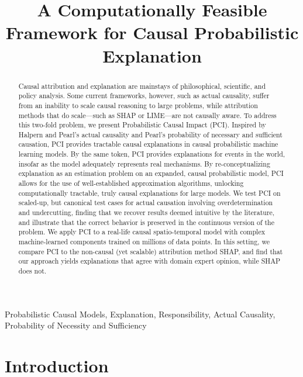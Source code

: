 \documentclass[anon,12pt]{clear2026} %
\title[Explainable]{A Computationally Feasible Framework for  Causal Probabilistic Explanation}
\newcommand{\ourapproach}{PCI }
\newcommand{\Ourapproach}{PCI}
\begin{document}
\maketitle

\begin{abstract}%
  Causal attribution and explanation are mainstays of philosophical, scientific, and policy analysis. Some current frameworks, however, such as actual causality, suffer from an inability to scale causal reasoning to large problems, while attribution methods that do scale---such as SHAP or LIME---are not causally aware. To address this two-fold problem, we present Probabilistic Causal Impact (\Ourapproach). Inspired by Halpern and Pearl's actual causality and Pearl's probability of necessary and sufficient causation, \ourapproach provides tractable causal explanations in causal probabilistic machine learning models. By the same token, \ourapproach provides explanations for events in the world, insofar as the model adequately represents real mechanisms. By re-conceptualizing explanation as an estimation problem on an expanded, causal probabilistic model, \ourapproach allows for the use of well-established approximation algorithms, unlocking computationally tractable, truly causal explanations for large models. We test \ourapproach on scaled-up, but canonical test cases for actual causation involving overdetermination and undercutting, finding that we recover results deemed intuitive by the literature, and illustrate that the correct behavior is preserved in the continuous version of the problem. We apply \ourapproach to a real-life causal spatio-temporal model with complex machine-learned components trained on millions of data points. In this setting, we compare \ourapproach to the non-causal (yet scalable) attribution method SHAP, and find that our approach yields explanations that agree with domain expert opinion, while SHAP does not. 
 
  
\end{abstract}

\begin{keywords}%
  Probabilistic Causal Models, Explanation, Responsibility, Actual Causality, Probability of Necessity and Sufficiency
\end{keywords}


\section{Introduction}
\label{sec:intro}
\end{document}
